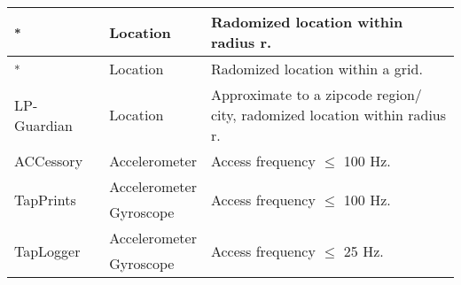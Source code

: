 \begin{table}
\begin{tabular}{|l|l|l|}
\cite{andres2013geo}\textsuperscript{*} & Location & Radomized 
location within radius r.   \\ \hline

\cite{bordenabe2014optimal}\textsuperscript{*}
& Location & Radomized location within a grid.   \\ \hline


\multirow{3}{*}{LP-Guardian~\cite{fawaz2014location}}
& \multirow{3}{*}{Location} & \multirow{3}{3.5cm}{Approximate to a zipcode 
region/ city, radomized location within radius r.}    \\ 
& & \\ 
& & \\ \hline

ACCessory~\cite{owusu2012accessory} & Accelerometer & 
Access frequency $\leq$ 100 Hz.  \\ \hline

\multirow{2}{*}{TapPrints~\cite{miluzzo2012tapprints}} & Accelerometer 
& \multirow{2}{*}{Access frequency $\leq$ 100 Hz.}   \\ \cline{2-2}
& Gyroscope &  \\ \hline

\multirow{2}{*}{TapLogger~\cite{xu2012taplogger}} & Accelerometer & \multirow{2}{*}{Access 
frequency $\leq$ 25 Hz.}   \\ \cline{2-2}
& Gyroscope &   \\ \hline


\end{tabular}
\end{table}
